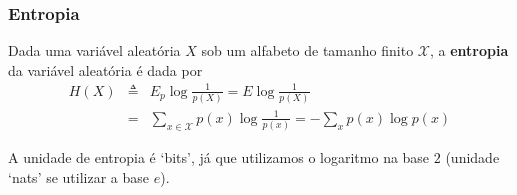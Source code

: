 \begin{frame}%
  \frametitle{Entropia}
  \begin{definition}[Entropia]\label{def-entropia}
  Dada uma variável aleatória $X$ sob um alfabeto de tamanho finito $\mathcal{X}$, a \textbf{entropia}
  da variável aleatória é dada por
  \begin{eqnarray}
  H(X) &\triangleq& E_p \log \frac{1}{p(X)} = E \log \frac{1}{p(X)} \\
        &=& \sum_{x \in \mathcal{X}} p(x) \log \frac{1}{p(x)} = - \sum_x p(x) \log p(x)
  \end{eqnarray}
  \end{definition}
  A unidade de entropia é `bits', já que utilizamos o logaritmo na base $2$ (unidade `nats' se 
  utilizar a base $e$).
\end{frame}

